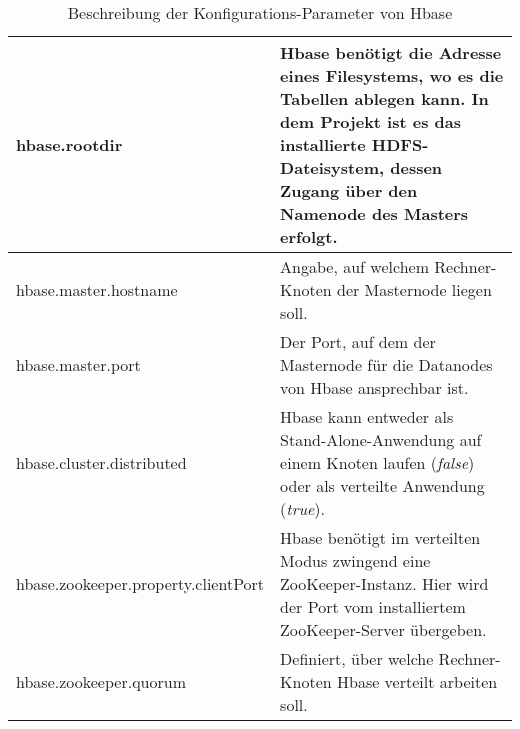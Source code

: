 \begin{appendices}
\begin{table}
	\begin{tabularx}{\textwidth}{| X | X |} \hline
	hbase.rootdir &  Hbase benötigt die Adresse eines Filesystems, wo es die Tabellen ablegen kann. In dem Projekt ist es das installierte
	HDFS-Dateisystem, dessen Zugang über den Namenode des Masters erfolgt.\\ \hline
	hbase.master.hostname & Angabe, auf welchem Rechner-Knoten der Masternode liegen soll.\\ \hline
	hbase.master.port & Der Port, auf dem der Masternode für die Datanodes von Hbase ansprechbar ist. \\ \hline
	hbase.cluster.distributed & Hbase kann entweder als Stand-Alone-Anwendung auf einem Knoten laufen (\textit{false}) oder als verteilte
	 Anwendung (\textit{true}). \\ \hline
	hbase.zookeeper.property.clientPort & Hbase benötigt im verteilten Modus zwingend eine ZooKeeper-Instanz. Hier wird der Port vom
	 installiertem ZooKeeper-Server übergeben.\\ \hline
	hbase.zookeeper.quorum &  Definiert, über welche Rechner-Knoten Hbase verteilt arbeiten soll. \\ \hline
	\end{tabularx}
	\caption{Beschreibung der Konfigurations-Parameter von Hbase}
	\label{config:hbaseDescription}
\end{table}

\end{appendices}
